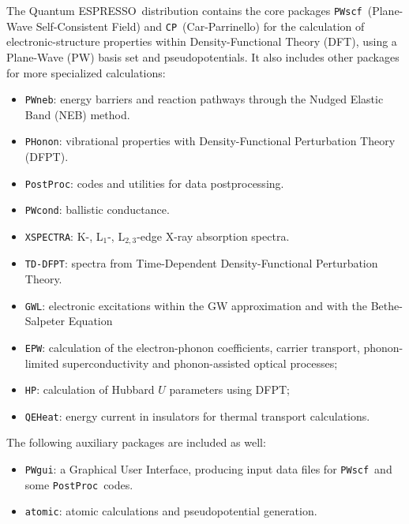 \documentclass[12pt,a4paper]{article}
\def\qe{{\sc Quantum ESPRESSO}}
\def\PWscf{\texttt{PWscf}}
\def\PHonon{\texttt{PHonon}}
\def\CP{\texttt{CP}}
\def\PostProc{\texttt{PostProc}}
\def\NEB{\texttt{PWneb}}
\begin{document}
The \qe\ distribution contains the core packages \PWscf\ (Plane-Wave
Self-Consistent Field) and \CP\ (Car-Parrinello) for the calculation
of electronic-structure properties within
Density-Functional Theory (DFT), using a Plane-Wave (PW) basis set
and pseudopotentials. It also includes other packages for
more specialized calculations:
\begin{itemize}
  \item \NEB:
        energy barriers and reaction pathways through the Nudged Elastic Band
        (NEB) method.
      \item \PHonon:
        vibrational properties  with Density-Functional Perturbation Theory
        (DFPT).
  \item \PostProc:
        codes and utilities for data postprocessing.
  \item \texttt{PWcond}:
        ballistic conductance.
  \item \texttt{XSPECTRA}:
        K-, L$_1$-, L$_{2,3}$-edge X-ray absorption spectra.
  \item \texttt{TD-DFPT}:
        spectra from Time-Dependent
        Density-Functional Perturbation Theory.
  \item \texttt{GWL}: electronic excitations within the GW approximation
        and with the Bethe-Salpeter Equation
  \item \texttt{EPW}: calculation of the electron-phonon coefficients,
        carrier transport, phonon-limited superconductivity and phonon-assisted
        optical processes;
  \item \texttt{HP}: calculation of Hubbard $U$ parameters using DFPT;
  \item \texttt{QEHeat}: energy current in insulators for thermal
        transport calculations.
\end{itemize}
The following auxiliary packages are included as well:
\begin{itemize}
\item \texttt{PWgui}:
      a Graphical User Interface, producing input data files for
      \PWscf\ and some \PostProc\ codes.
\item \texttt{atomic}:
      atomic calculations and pseudopotential generation.
\end{itemize}
\end{document}
